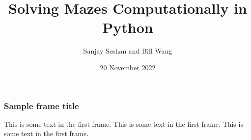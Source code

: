 \documentclass{beamer}
\title{Solving Mazes Computationally in Python}
\author{Sanjay Seshan and Bill Wang}
\institute{MIT Splash}
\date{20 November 2022}
\begin{document}
\frame{\titlepage}

\begin{frame}
\frametitle{Sample frame title}
This is some text in the first frame. This is some text in the first frame. This is some text in the first frame.
\end{frame}
\end{document}
